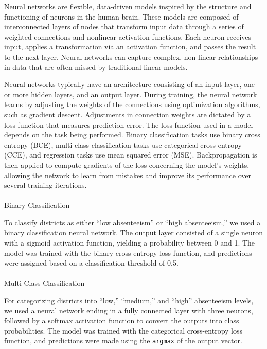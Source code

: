 \documentclass[
  11pt,
]{article}
\makeatletter
\let\oldparagraph\paragraph
\renewcommand{\paragraph}{
    \@ifstar
      \xxxParagraphStar
      \xxxParagraphNoStar
  }
\newcommand{\xxxParagraphStar}[1]{\oldparagraph*{#1}\mbox{}}
\newcommand{\xxxParagraphNoStar}[1]{\oldparagraph{#1}\mbox{}}
\makeatother
\begin{document}
Neural networks are flexible, data-driven models inspired by the
structure and functioning of neurons in the human brain. These models
are composed of interconnected layers of nodes that transform input data
through a series of weighted connections and nonlinear activation
functions. Each neuron receives input, applies a transformation via an
activation function, and passes the result to the next layer. Neural
networks can capture complex, non-linear relationships in data that are
often missed by traditional linear models.

Neural networks typically have an architecture consisting of an input
layer, one or more hidden layers, and an output layer. During training,
the neural network learns by adjusting the weights of the connections
using optimization algorithms, such as gradient descent. Adjustments in
connection weights are dictated by a loss function that measures
prediction error. The loss function used in a model depends on the task
being performed. Binary classification tasks use binary cross entropy
(BCE), multi-class classification tasks use categorical cross entropy
(CCE), and regression tasks use mean squared error (MSE).
Backpropagation is then applied to compute gradients of the loss
concerning the model's weights, allowing the network to learn from
mistakes and improve its performance over several training iterations.

\paragraph{Binary Classification}\label{binary-classification}

To classify districts as either ``low absenteeism'' or ``high
absenteeism,'' we used a binary classification neural network. The
output layer consisted of a single neuron with a sigmoid activation
function, yielding a probability between 0 and 1. The model was trained
with the binary cross-entropy loss function, and predictions were
assigned based on a classification threshold of 0.5.

\paragraph{Multi-Class Classification}\label{multi-class-classification}

For categorizing districts into ``low,'' ``medium,'' and ``high''
absenteeism levels, we used a neural network ending in a fully connected
layer with three neurons, followed by a softmax activation function to
convert the outputs into class probabilities. The model was trained with
the categorical cross-entropy loss function, and predictions were made
using the \texttt{argmax} of the output vector.
\end{document}
